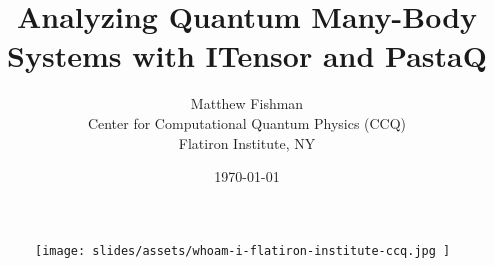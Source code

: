 \documentclass{beamer}
\title{
  \centering
  Analyzing Quantum Many-Body Systems with ITensor and PastaQ
}
\author{
  \centering
  Matthew Fishman \\
  Center for Computational Quantum Physics (CCQ) \\
  Flatiron Institute, NY \\
  \myhref{mtfishman.github.io}{https://mtfishman.github.io/}
}
\date{\today}
\begin{document}
\begin{frame}

  \begin{center}

    \maketitle

  \end{center}

  \begin{figure}[T]

      \centering
      \texttt{[image: 
        slides/assets/whoam-i-flatiron-institute-ccq.jpg
      ]}

  \end{figure}

\end{frame}






































\end{document}
